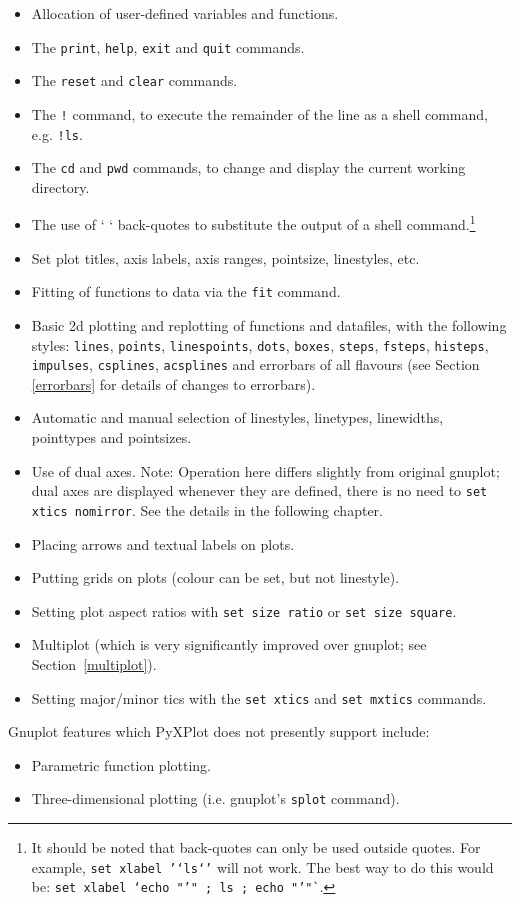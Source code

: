 \begin{itemize}
\item Allocation of user-defined variables and functions.
\item The \texttt{print}, \texttt{help}, \texttt{exit} and \texttt{quit} commands.
\item The \texttt{reset} and \texttt{clear} commands.
\item The \texttt{!} command, to execute the remainder of the line as a shell command, e.g. \texttt{!ls}.
\item The \texttt{cd} and \texttt{pwd} commands, to change and display the current working directory.
\item The use of ` ` back-quotes to substitute the output of a shell command.\footnote{It should be noted that back-quotes can only be used outside quotes. For example, \texttt{set xlabel '`ls`'} will not work. The best way to do this would be: \texttt{set xlabel `echo "'" ; ls ; echo "'"`}.}
\item Set plot titles, axis labels, axis ranges, pointsize, linestyles, etc.
\item Fitting of functions to data via the \texttt{fit} command.
\item Basic 2d plotting and replotting of functions and datafiles, with the following styles: \texttt{lines}, \texttt{points}, \texttt{linespoints}, \texttt{dots}, \texttt{boxes}, \texttt{steps}, \texttt{fsteps}, \texttt{histeps}, \texttt{impulses}, \texttt{csplines}, \texttt{acsplines} and errorbars of all flavours (see Section \ref{errorbars} for details of changes to errorbars).
\item Automatic and manual selection of linestyles, linetypes, linewidths, pointtypes and pointsizes.
\item Use of dual axes. Note: Operation here differs slightly from original gnuplot; dual axes are displayed whenever they are defined, there is no need to \texttt{set xtics nomirror}. See the details in the following chapter.
\item Placing arrows and textual labels on plots.
\item Putting grids on plots (colour can be set, but not linestyle).
\item Setting plot aspect ratios with \texttt{set size ratio} or \texttt{set size square}.
\item Multiplot (which is very significantly improved over gnuplot; see Section~\ref{multiplot}).
\item Setting major/minor tics with the \texttt{set xtics} and \texttt{set mxtics} commands.
\end{itemize}

Gnuplot features which PyXPlot does not presently support include:

\begin{itemize}
\item Parametric function plotting.
\item Three-dimensional plotting (i.e. gnuplot's \texttt{splot} command).
\end{itemize}
